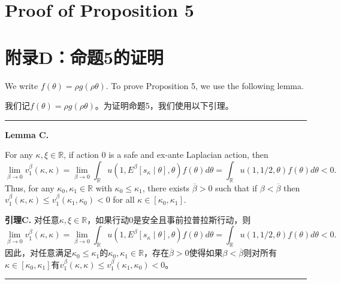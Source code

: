 \documentclass[12pt,a4paper]{article}
\newenvironment{original}
  {\par\medskip\noindent\color{black}\ignorespaces}
  {\par\medskip}
\newenvironment{translation}
  {\par\noindent\color{darkblue}\ignorespaces}
  {\par\medskip\noindent\hrule\par\medskip}
\theoremstyle{definition}
\theoremstyle{remark}
\begin{document}
\section{Proof of Proposition 5}
\section*{\color{darkblue}附录D：命题5的证明}

\begin{original}
We write $f(\theta) = \rho g(\rho \theta)$. To prove Proposition 5, we use the following lemma.
\end{original}
\begin{translation}
我们记$f(\theta) = \rho g(\rho \theta)$。为证明命题5，我们使用以下引理。
\end{translation}

\medskip
\noindent\textbf{Lemma C.}
\begin{original}
For any $\kappa, \xi \in \mathbb{R}$, if action 0 is a safe and ex-ante Laplacian action, then
\[
\lim_{\beta \to 0} v_1^\beta(\kappa, \kappa) = \lim_{\beta \to 0} \int_{\mathbb{R}} u(1, E^\beta[s_\kappa \mid \theta], \theta) f(\theta) d\theta = \int_{\mathbb{R}} u(1, 1/2, \theta) f(\theta) d\theta < 0.
\tag{D.1}
\]
Thus, for any $\kappa_0, \kappa_1 \in \mathbb{R}$ with $\kappa_0 \le \kappa_1$, there exists $\overline{\beta} > 0$ such that if $\beta < \overline{\beta}$ then $v_1^\beta(\kappa, \kappa) \le v_1^\beta(\kappa_1, \kappa_0) < 0$ for all $\kappa \in [\kappa_0, \kappa_1]$.
\end{original}
\begin{translation}
\color{darkblue}\textbf{引理C.} 对任意$\kappa, \xi \in \mathbb{R}$，如果行动0是安全且事前拉普拉斯行动，则
\[
\lim_{\beta \to 0} v_1^\beta(\kappa, \kappa) = \lim_{\beta \to 0} \int_{\mathbb{R}} u(1, E^\beta[s_\kappa \mid \theta], \theta) f(\theta) d\theta = \int_{\mathbb{R}} u(1, 1/2, \theta) f(\theta) d\theta < 0.
\tag{D.1}
\]
因此，对任意满足$\kappa_0 \le \kappa_1$的$\kappa_0, \kappa_1 \in \mathbb{R}$，存在$\overline{\beta} > 0$使得如果$\beta < \overline{\beta}$则对所有$\kappa \in [\kappa_0, \kappa_1]$有$v_1^\beta(\kappa, \kappa) \le v_1^\beta(\kappa_1, \kappa_0) < 0$。
\end{translation}
\end{document}
